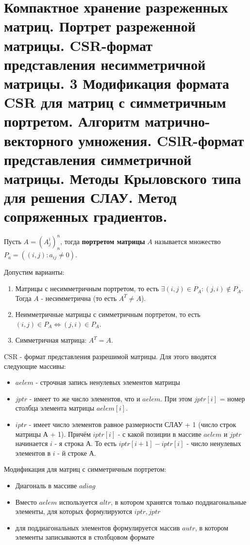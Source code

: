 \documentclass[__main__.tex]{subfiles}
\begin{document}
\section{Компактное хранение разреженных матриц. Портрет разреженной матрицы. CSR-формат представления несимметричной матрицы. 3 Модификация формата CSR для матриц с симметричным портретом. Алгоритм матрично-векторного умножения. CSlR-формат представления симметричной матрицы. Методы Крыловского типа для решения СЛАУ. Метод сопряженных градиентов.}

Пусть $A = \left(A^i_j\right)^n_n$, тогда \textbf{портретом матрицы} $A$ называется множество $P_a = \left(\left(i, j\right): a_{ij} \neq 0\right)$.

Допустим варианты:

\begin{enumerate}
	\item Матрицы с несимметричным портретом, то есть $\exists \left(i, j\right) \in P_A: \left(j, i\right) \notin P_A$. Тогда $A$ - несимметрична (то есть $A^T \neq A$).
	
	\item Неимметричные матрицы с симметричным портретом, то есть $\left(i, j\right) \in P_A \Leftrightarrow \left(j, i\right) \in P_A$.
	
	\item Симметричная матрица: $A^T = A$.
\end{enumerate}

CSR - формат представления разрешимой матрицы. Для этого вводятся следующие массивы:

\begin{itemize}
	\item $aelem$ - строчная запись ненулевых элементов матрицы
	
	\item $jptr$ - имеет то же число элементов, что и $aelem$. При этом $jptr\left[i\right]$ = номер столбца элемента матрицы $aelem\left[i\right]$.
	
	\item $iptr$ - имеет число элементов равное размерности СЛАУ + 1 (число строк матрицы А + 1). Причём $iptr\left[i\right]$ - с какой позиции в массиве $aelem$ и $jptr$ начинается $i$ - я строка А. То есть $iptr\left[i + 1\right] - iptr\left[i\right]$ - число ненулевых элементов в $i$ - й строке А.
\end{itemize}

Модификация для матриц с симметричным портретом:

\begin{itemize}
	\item Диагональ в массиве $adiag$
	
	\item Вместо $aelem$ используется $altr$, в котором хранятся только поддиагональные элементы, для которых формулируются $iptr, jptr$
	
	\item для поддиагональных элементов формулируется массив $autr$, в котором элементы записываются в столбцовом формате
\end{itemize}
\end{document}
